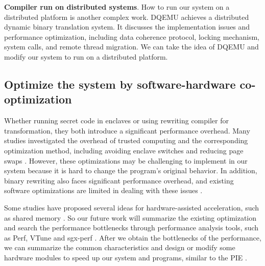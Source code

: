 \textbf{Compiler run on distributed systems}.
How to run our system on a distributed platform is another complex work.
DQEMU \cite{Zhao2020DQEMUAS} achieves a distributed dynamic binary translation system.
It discusses the implementation issues and performance optimization, including
data coherence protocol, locking mechanism, system calls, and remote thread migration.
We can take the idea of DQEMU and modify our system to run on a distributed platform.

\subsection{Optimize the system by software-hardware co-optimization}
\label{sec:ToolWithOptimization}
Whether running secret code in enclaves or using rewriting compiler for transformation,
they both introduce a significant performance overhead.
Many studies investigated the overhead of trusted computing and
the corresponding optimization method, including avoiding enclave switches
\cite{Tian2018SwitchlessCM} and reducing page swaps \cite{Orenbach2017EleosEO, Taassori2018VAULTRP}.
However, these optimizations may be challenging to implement in our system because it is hard
to change the program's original behavior.
In addition, binary rewriting also faces significant performance overhead, and existing
software optimizations are limited in dealing with these issues \cite{Kim2003HardwareSF}.

Some studies have proposed several ideas for hardware-assisted acceleration, such as
shared memory \cite{Jiang2022CRONUSFS}.
So our future work will summarize the existing optimization and search the performance
bottlenecks through performance analysis tools, such as Perf, VTune and sgx-perf \cite{Weichbrodt2018sgxperfAP}.
After we obtain the bottlenecks of the performance, we can summarize the common characteristics
and design or modify some hardware modules to speed up our system and programs, similar to
the PIE \cite{Schneider2021PIEAP}.